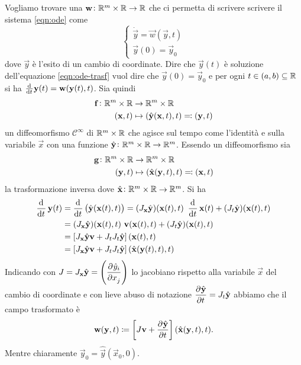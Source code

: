 Vogliamo trovare una $ \mathbf{w} \colon \mathbb{R}^m \times \mathbb{R} \to \mathbb{R} $ che ci permetta di scrivere scrivere il sistema \eqref{eqn:ode} come
\begin{equation} \label{eqn:ode-trasf}
    \begin{cases}
    \dot{\vec{y}} = \vec{w}(\vec{y}, t) \\
    \vec{y}(0) = \vec{y}_0
    \end{cases}
\end{equation}
dove $ \vec{y} $ è l'esito di un cambio di coordinate. Dire che $ \vec{y}(t) $ è soluzione dell'equazione \eqref{eqn:ode-trasf} vuol dire che $ \vec{y}(0) = \vec{y}_0 $ e per ogni $ t \in (a, b) \subseteq \mathbb{R} $ si ha $ \od{}{t} \vec{y}(t) = \vec{w}(\vec{y}(t), t) $. Sia quindi
\begin{align*}
    \mathbf{f} \colon \mathbb{R}^m \times \mathbb{R} & \to \mathbb{R}^m \times \mathbb{R} \\
    (\mathbf{x}, t) & \mapsto (\hat{\mathbf{y}}(\mathbf{x}, t), t) \eqqcolon (\mathbf{y}, t)
\end{align*}
un diffeomorfismo $ \mathcal{C}^\infty $  di $ \mathbb{R}^m \times \mathbb{R} $ che agisce sul tempo come l'identità e sulla variabile $ \vec{x} $ con una funzione $ \hat{\mathbf{y}} \colon \mathbb{R}^m \times \mathbb{R} \to \mathbb{R}^m $. Essendo un diffeomorfismo sia
\begin{align*}
    \mathbf{g} \colon \mathbb{R}^m \times \mathbb{R} & \to \mathbb{R}^m \times \mathbb{R} \\
    (\mathbf{y}, t) & \mapsto (\hat{\mathbf{x}}(\mathbf{y}, t), t) \eqqcolon (\mathbf{x}, t)
\end{align*}
la trasformazione inversa dove $ \hat{\mathbf{x}} \colon \mathbb{R}^m \times \mathbb{R} \to \mathbb{R}^m $. Si ha
\begin{align*}
    \dod{}{t} \vec{y}(t) & = \dod{}{t} \left( \hat{\vec{y}}(\vec{x}(t), t)\right) = (J_\vec{x} \hat{\vec{y}})(\vec{x}(t), t) \ \dod{}{t} \vec{x}(t)  + (J_t \hat{\vec{y}})(\vec{x}(t), t) \\
    & = (J_\vec{x} \hat{\vec{y}})(\vec{x}(t), t) \ \vec{v}(\vec{x}(t), t)  + (J_t \hat{\vec{y}})(\vec{x}(t), t) \\
    & = \left[J_\vec{x} \hat{\vec{y}} \vec{v} + J_t J_t \hat{\vec{y}}\right] (\vec{x}(t), t) \\
    & = \left[J_\vec{x} \hat{\vec{y}} \vec{v} + J_t J_t \hat{\vec{y}}\right] (\hat{\vec{x}}(\vec{y}(t), t), t)
\end{align*}
Indicando con $ J = J_\vec{x} \hat{\vec{y}} = \left(\dpd{\hat{y}_i}{x_j}\right) $ lo jacobiano rispetto alla variabile $ \vec{x} $ del cambio di coordinate e con lieve abuso di notazione $ \dpd{\hat{\vec{y}}}{t} = J_t \hat{\vec{y}} $ abbiamo che il campo trasformato è
\begin{equation}
    \vec{w}(\vec{y}, t) \coloneqq \left[ J \vec{v} + \dpd{\hat{\vec{y}}}{t}\right] (\hat{\vec{x}}(\vec{y}, t), t).
\end{equation}
Mentre chiaramente $ \vec{y}_0 = \hat{\vec{y}}(\vec{x}_0, 0) $.

